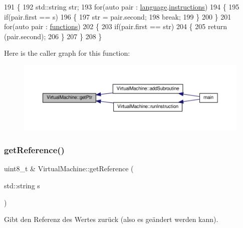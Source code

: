\begin{DoxyCode}
191 \{
192     std::string str;
193     \textcolor{keywordflow}{for}(\textcolor{keyword}{auto} pair : \mbox{\hyperlink{class_virtual_machine_af4dd2663e7f1ea25ba6c88da94e6ef01}{language}}.\mbox{\hyperlink{class_sprache_a6052a9ec0d1202da4b8ff6e6a52e6244}{instructions}})
194     \{
195         \textcolor{keywordflow}{if}(pair.first == s)
196         \{   
197             str = pair.second;
198             \textcolor{keywordflow}{break};
199         \}
200     \}
201     \textcolor{keywordflow}{for}(\textcolor{keyword}{auto} pair : \mbox{\hyperlink{class_virtual_machine_a1b1e03784277347206641bf47e39d6d1}{functions}})
202     \{
203         \textcolor{keywordflow}{if}(pair.first == str)
204         \{
205             \textcolor{keywordflow}{return} (pair.second);
206         \}
207     \}
208 \}
\end{DoxyCode}
Here is the caller graph for this function\+:
\nopagebreak
\begin{figure}[H]
\begin{center}
\leavevmode
\includegraphics[width=350pt]{class_virtual_machine_a7029636f9766e0394a8b9d60264a3565_icgraph}
\end{center}
\end{figure}
\mbox{\label{class_virtual_machine_a0f55b241f2e14264dfaec5449d136a50}} 
\subsubsection{\texorpdfstring{get\+Reference()}{getReference()}}
{\footnotesize\ttfamily uint8\+\_\+t \& Virtual\+Machine\+::get\+Reference (\begin{DoxyParamCaption}\item[{std\+::string}]{s }\end{DoxyParamCaption})}

Gibt den Referenz des Wertes zurück (also es geändert werden kann). 

